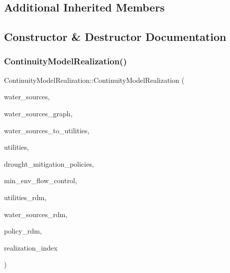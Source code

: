 \subsection*{Additional Inherited Members}


\subsection{Constructor \& Destructor Documentation}
\mbox{\label{classContinuityModelRealization_a641c096ac73586597b3e21a5d516c923}} 
\subsubsection{\texorpdfstring{Continuity\+Model\+Realization()}{ContinuityModelRealization()}}
{\footnotesize\ttfamily Continuity\+Model\+Realization\+::\+Continuity\+Model\+Realization (\begin{DoxyParamCaption}\item[{vector$<$ \mbox{\hyperlink{classWaterSource}{Water\+Source}} $\ast$$>$ \&}]{water\+\_\+sources,  }\item[{const \mbox{\hyperlink{classGraph}{Graph}} \&}]{water\+\_\+sources\+\_\+graph,  }\item[{const vector$<$ vector$<$ int $>$$>$ \&}]{water\+\_\+sources\+\_\+to\+\_\+utilities,  }\item[{vector$<$ \mbox{\hyperlink{classUtility}{Utility}} $\ast$$>$ \&}]{utilities,  }\item[{const vector$<$ \mbox{\hyperlink{classDroughtMitigationPolicy}{Drought\+Mitigation\+Policy}} $\ast$$>$ \&}]{drought\+\_\+mitigation\+\_\+policies,  }\item[{vector$<$ \mbox{\hyperlink{classMinEnvFlowControl}{Min\+Env\+Flow\+Control}} $\ast$$>$ \&}]{min\+\_\+env\+\_\+flow\+\_\+control,  }\item[{vector$<$ double $>$ \&}]{utilities\+\_\+rdm,  }\item[{vector$<$ double $>$ \&}]{water\+\_\+sources\+\_\+rdm,  }\item[{vector$<$ double $>$ \&}]{policy\+\_\+rdm,  }\item[{const unsigned int}]{realization\+\_\+index }\end{DoxyParamCaption})}

